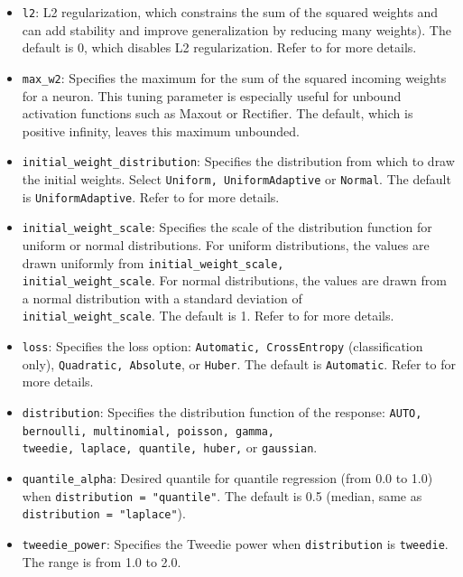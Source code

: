 {{\begin{itemize}
\item \texttt{l2}: L2 regularization, which constrains the sum of the squared weights and can add stability and improve generalization by reducing many weights). The default is 0, which disables L2 regularization. Refer to {\textbf{}} for more details.

\item \texttt{max\_w2}: Specifies the maximum for the sum of the squared incoming weights for a neuron. This tuning parameter is especially useful for unbound activation functions such as Maxout or Rectifier. The default, which is positive infinity, leaves this maximum unbounded.

\item \texttt{initial\_weight\_distribution}: Specifies the distribution from which to draw the initial weights. Select \texttt{Uniform, UniformAdaptive} or \texttt{Normal}. The default is \texttt{UniformAdaptive}. Refer to {\textbf{}} for more details.

\item \texttt{initial\_weight\_scale}: Specifies the scale of the distribution function for uniform or normal distributions. For uniform distributions, the values are drawn uniformly from \texttt{initial\_weight\_scale, \\ initial\_weight\_scale}. For normal distributions, the values are drawn from a normal distribution with a standard deviation of \\ \texttt{initial\_weight\_scale}. The default is 1. Refer to {\textbf{}} for more details.

\item \texttt{loss}: Specifies the loss option: \texttt{Automatic, CrossEntropy} (classification only), \texttt{Quadratic, Absolute}, or \texttt{Huber}. The default is \texttt{Automatic}. Refer to {\textbf{}} for more details.

\item \texttt{distribution}: Specifies the distribution function of the response: \texttt{AUTO, bernoulli, multinomial, poisson, gamma, \\ tweedie, laplace, quantile, huber,} or \texttt{gaussian}. 

\item {\texttt{quantile\_alpha}}: Desired quantile for quantile regression (from 0.0 to 1.0) when \texttt{distribution = "quantile"}.  The default is 0.5 (median, same as \texttt{distribution = "laplace"}).
\item \texttt{tweedie\_power}: Specifies the Tweedie power when \texttt{distribution} is  \texttt{tweedie}. The range is from 1.0 to 2.0. 


\end{itemize}}}

